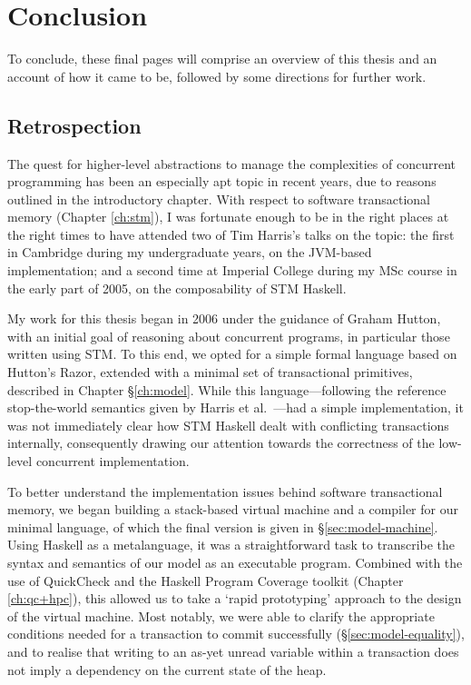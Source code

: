 \chapter{Conclusion}

To conclude, these final pages will comprise an overview of this thesis and
an account of how it came to be, followed by some directions for further
work.

\section{Retrospection}%

The quest for higher-level abstractions to manage the complexities of
concurrent programming has been an especially apt topic in recent years, due
to reasons outlined in the introductory chapter. With respect to software
transactional memory (Chapter \ref{ch:stm}), I was fortunate enough to be in
the right places at the right times to have attended two of Tim Harris's
talks on the topic: the first in Cambridge during my undergraduate years, on
the JVM-based implementation; and a second time at Imperial College during
my MSc course in the early part of 2005, on the composability of STM
Haskell.

My work for this thesis began in 2006 under the guidance of Graham Hutton,
with an initial goal of reasoning about concurrent programs, in particular
those written using STM. To this end, we opted for a simple formal language
based on Hutton's Razor, extended with a minimal set of transactional
primitives, described in Chapter \S\ref{ch:model}. While this
language---following the reference stop-the-world semantics given by Harris
et al.~\cite{harris05-composable}---had a simple implementation, it was not
immediately clear how STM Haskell dealt with conflicting transactions
internally, consequently drawing our attention towards the correctness of
the low-level concurrent implementation.

To better understand the implementation issues behind software transactional
memory, we began building a stack-based virtual machine and a compiler for
our minimal language, of which the final version is given in
\S\ref{sec:model-machine}. Using Haskell as a metalanguage, it was
a straightforward task to transcribe the syntax and semantics of our model
as an executable program. Combined with the use of QuickCheck and the
Haskell Program Coverage toolkit (Chapter \ref{ch:qc+hpc}), this allowed us
to take a `rapid prototyping' approach to the design of the virtual machine.
Most notably, we were able to clarify the appropriate conditions needed for
a transaction to commit successfully (\S\ref{sec:model-equality}), and to
realise that writing to an as-yet unread variable within a transaction does
not imply a dependency on the current state of the heap.

